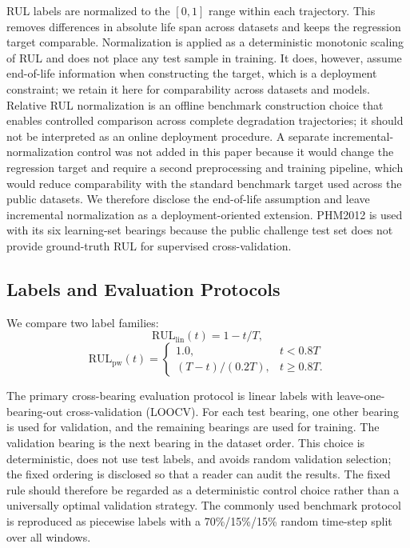 \documentclass[pdflatex,sn-mathphys-num]{sn-jnl}
\begin{document}
RUL labels are normalized to the $[0,1]$ range within each trajectory. This removes differences in absolute life span across datasets and keeps the regression target comparable. Normalization is applied as a deterministic monotonic scaling of RUL and does not place any test sample in training. It does, however, assume end-of-life information when constructing the target, which is a deployment constraint; we retain it here for comparability across datasets and models. Relative RUL normalization is an offline benchmark construction choice that enables controlled comparison across complete degradation trajectories; it should not be interpreted as an online deployment procedure. A separate incremental-normalization control was not added in this paper because it would change the regression target and require a second preprocessing and training pipeline, which would reduce comparability with the standard benchmark target used across the public datasets. We therefore disclose the end-of-life assumption and leave incremental normalization as a deployment-oriented extension. PHM2012 is used with its six learning-set bearings because the public challenge test set does not provide ground-truth RUL for supervised cross-validation.

\subsection{Labels and Evaluation Protocols}
We compare two label families:
\begin{equation}
\text{RUL}_{\text{lin}}(t) = 1 - t/T,
\label{eq:linear}
\end{equation}
\begin{equation}
\text{RUL}_{\text{pw}}(t) =
\begin{cases}
1.0, & t < 0.8T \\
(T - t)/(0.2T), & t \geq 0.8T.
\end{cases}
\label{eq:piecewise}
\end{equation}

The primary cross-bearing evaluation protocol is linear labels with leave-one-bearing-out cross-validation (LOOCV). For each test bearing, one other bearing is used for validation, and the remaining bearings are used for training. The validation bearing is the next bearing in the dataset order. This choice is deterministic, does not use test labels, and avoids random validation selection; the fixed ordering is disclosed so that a reader can audit the results. The fixed rule should therefore be regarded as a deterministic control choice rather than a universally optimal validation strategy. The commonly used benchmark protocol is reproduced as piecewise labels with a 70\%/15\%/15\% random time-step split over all windows.
\end{document}
